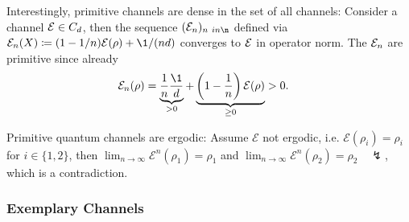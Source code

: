 Interestingly, primitive channels are dense in the set of all channels: Consider a channel $\mathcal E \in C_d$, then the sequence $(\m E_n)_{n\ in\n}$ defined via $\m E_n(X)\coloneqq (1-1/n)\m E(\rho) + \1/(nd)$ converges to $\mathcal E$ in operator norm. The $\mathcal E_n$ are primitive since already
\begin{align*}
    \mathcal{E}_n(\rho) &= \underbrace{\frac{1}{n} \frac{\1}{d}}_{> 0} + \underbrace{\left(1 - \frac{1}{n}\right) \mathcal{E}(\rho)}_{\ge 0} > 0.
\end{align*}

Primitive quantum channels are ergodic: Assume $\mathcal{E}$ not ergodic, i.e. $\mathcal{E}(\rho_i) = \rho_i$ for $i \in \{1,2\}$, then $
    \lim_{n \to \infty} \mathcal{E}^n(\rho_1) = \rho_1$ and $\lim_{n \to \infty} \mathcal{E}^n(\rho_2) = \rho_2 \quad \lightning$, which is a contradiction. 


\subsubsection{Exemplary Channels}

